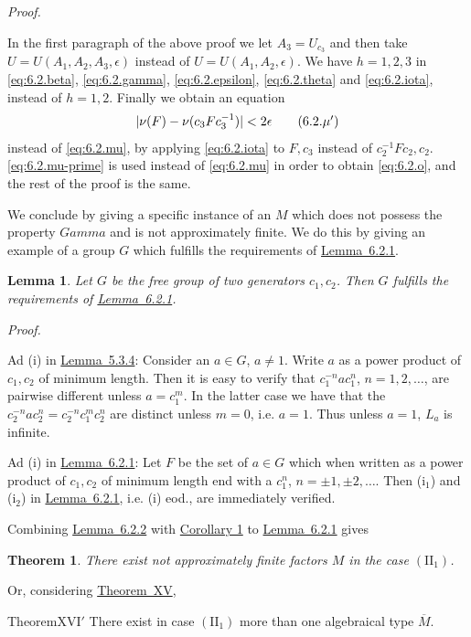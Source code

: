 \documentclass[b5paper,twoside]{article}
\newcommand{\thmref}[2]{\hyperref[#1]{\mbox{Theorem~#2}}}
\newcommand{\lemref}[2]{\hyperref[#1]{\mbox{Lemma~#2}}}
\theoremstyle{mvnplain}
\newtheorem{theorem}{Theorem}
\newtheorem{lemma}{Lemma}[section]
\renewenvironment{proof}[1][Proof]{%
  \par\addvspace{0.35\baselineskip}%
  \noindent\textit{#1.}\ \normalfont\ignorespaces
}{%
  \par\addvspace{0.35\baselineskip}%
}
\newcommand{\M}{\mathbf M}
\def\M{M}%
\def\Gamma{Gamma}%
\def\mathfrak#1{#1}%
\begin{document}
\begin{proof}
In the first paragraph of the above proof we let $A_3=U_{c_3}$ and then take
$U=U(A_1,A_2,A_3,\epsilon)$ instead of $U=U(A_1,A_2,\epsilon)$. We have
$h=1,2,3$ in \eqref{eq:6.2.beta}, \eqref{eq:6.2.gamma},
\eqref{eq:6.2.epsilon}, \eqref{eq:6.2.theta} and \eqref{eq:6.2.iota}, instead
of $h=1,2$. Finally we obtain an equation
\begin{equation}
  |\nu(\mathfrak F)-\nu(c_3\mathfrak F c_3^{-1})|<2\epsilon
  \tag{6.2.\ensuremath{\mu'}}\label{eq:6.2.mu-prime}
\end{equation}
instead of \eqref{eq:6.2.mu}, by applying \eqref{eq:6.2.iota} to
$\mathfrak F,c_3$ instead of $c_2^{-1}\mathfrak F c_2,c_2$.
\eqref{eq:6.2.mu-prime} is used instead of \eqref{eq:6.2.mu} in order to
obtain \eqref{eq:6.2.o}, and the rest of the proof is the same.
\end{proof}

We conclude by giving a specific instance of an $\M$ which does not possess
the property $\Gamma$ and is not approximately finite. We do this by giving
an example of a group $\mathfrak G$ which fulfills the requirements of
\lemref{lem:6.2.1}{6.2.1}.

\begin{lemma}\label{lem:6.2.2}
Let $\mathfrak G$ be the free group of two generators $c_1,c_2$. Then
$\mathfrak G$ fulfills the requirements of \lemref{lem:6.2.1}{6.2.1}.
\end{lemma}

\begin{proof}
Ad (i) in \lemref{lem:5.3.4}{5.3.4}: Consider an $a\in\mathfrak G$,
$a\ne1$. Write $a$ as a power product of $c_1,c_2$ of minimum length. Then
it is easy to verify that $c_1^{-n}ac_1^n$, $n=1,2,\ldots$, are pairwise
different unless $a=c_1^m$. In the latter case we have that the
$c_2^{-n}ac_2^n=c_2^{-n}c_1^mc_2^n$ are distinct unless $m=0$, i.e. $a=1$.
Thus unless $a=1$, $\mathfrak L_a$ is infinite.

Ad (i) in \lemref{lem:6.2.1}{6.2.1}: Let $\mathfrak F$ be the set of
$a\in\mathfrak G$ which when written as a power product of $c_1,c_2$ of
minimum length end with a $c_1^n$, $n=\pm1,\pm2,\ldots$. Then (i$_1$) and
(i$_2$) in \lemref{lem:6.2.1}{6.2.1}, i.e. (i) eod., are immediately
verified.
\end{proof}

Combining \lemref{lem:6.2.2}{6.2.2} with
\hyperref[cor:6.2.1]{Corollary 1} to
\lemref{lem:6.2.1}{6.2.1} gives
\begin{theorem}\label{thm:XVI}
There exist not approximately finite factors $\M$ in the case
$(\mathrm{II}_1)$.
\end{theorem}
Or, considering \thmref{thm:XV}{XV},
\begin{namedstatement}{Theorem}{XVI$'$}\label{thm:XVI-prime}
There exist in case $(\mathrm{II}_1)$ more than one algebraical type
$\overline{\M}$.
\end{namedstatement}
\end{document}
